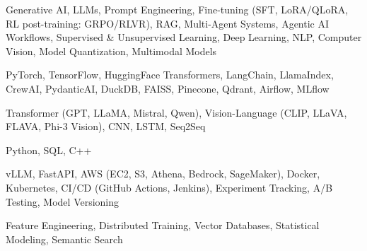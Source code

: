 \documentclass[letter,10pt]{article}
\begin{document}
 Generative AI, LLMs, Prompt Engineering, Fine-tuning (SFT, LoRA/QLoRA, RL post-training: GRPO/RLVR), RAG, Multi-Agent Systems, Agentic AI Workflows, Supervised \& Unsupervised Learning, Deep Learning, NLP, Computer Vision, Model Quantization, Multimodal Models\par\vspace{2pt}

 PyTorch, TensorFlow, HuggingFace Transformers, LangChain, LlamaIndex, CrewAI, PydanticAI, DuckDB, FAISS, Pinecone, Qdrant, Airflow, MLflow\par\vspace{2pt}

 Transformer (GPT, LLaMA, Mistral, Qwen), Vision-Language (CLIP, LLaVA, FLAVA, Phi-3 Vision), CNN, LSTM, Seq2Seq\par\vspace{2pt}

 Python, SQL, C++\par\vspace{2pt}

 vLLM, FastAPI, AWS (EC2, S3, Athena, Bedrock, SageMaker), Docker, Kubernetes, CI/CD (GitHub Actions, Jenkins), Experiment Tracking, A/B Testing, Model Versioning\par\vspace{2pt}

 Feature Engineering, Distributed Training, Vector Databases, Statistical Modeling, Semantic Search
\end{document}
